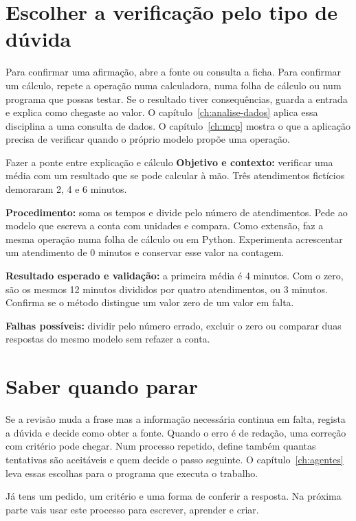 \section{Escolher a verificação pelo tipo de dúvida}

Para confirmar uma afirmação, abre a fonte ou consulta a ficha. Para confirmar um cálculo, repete a operação numa calculadora, numa folha de cálculo ou num programa que possas testar. Se o resultado tiver consequências, guarda a entrada e explica como chegaste ao valor. O capítulo~\ref{ch:analise-dados} aplica essa disciplina a uma consulta de dados. O capítulo~\ref{ch:mcp} mostra o que a aplicação precisa de verificar quando o próprio modelo propõe uma operação.

\begin{promptlabbox}{Fazer a ponte entre explicação e cálculo}
\textbf{Objetivo e contexto:} verificar uma média com um resultado que se pode calcular à mão. Três atendimentos fictícios demoraram 2, 4 e 6 minutos.

\textbf{Procedimento:} soma os tempos e divide pelo número de atendimentos. Pede ao modelo que escreva a conta com unidades e compara. Como extensão, faz a mesma operação numa folha de cálculo ou em Python. Experimenta acrescentar um atendimento de 0 minutos e conservar esse valor na contagem.

\textbf{Resultado esperado e validação:} a primeira média é 4 minutos. Com o zero, são os mesmos 12 minutos divididos por quatro atendimentos, ou 3 minutos. Confirma se o método distingue um valor zero de um valor em falta.

\textbf{Falhas possíveis:} dividir pelo número errado, excluir o zero ou comparar duas respostas do mesmo modelo sem refazer a conta.
\end{promptlabbox}

\section{Saber quando parar}

Se a revisão muda a frase mas a informação necessária continua em falta, regista a dúvida e decide como obter a fonte. Quando o erro é de redação, uma correção com critério pode chegar. Num processo repetido, define também quantas tentativas são aceitáveis e quem decide o passo seguinte. O capítulo~\ref{ch:agentes} leva essas escolhas para o programa que executa o trabalho.

Já tens um pedido, um critério e uma forma de conferir a resposta. Na próxima parte vais usar este processo para escrever, aprender e criar.

